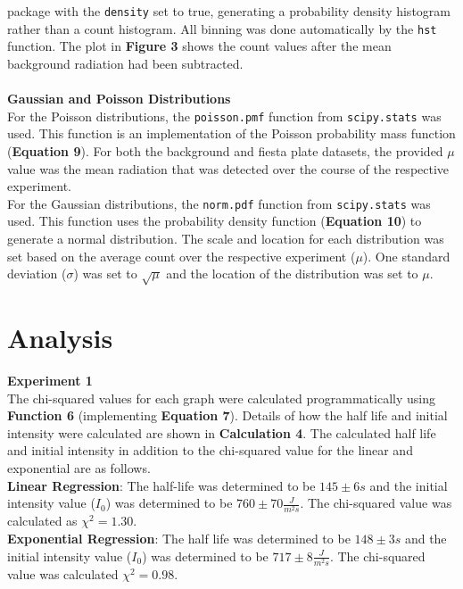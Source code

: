 \documentclass[
	letterpaper, %
	10pt, %
]{CSUniSchoolLabReport}
\begin{document}
package with the \lstinline{density} set to true, generating a probability density histogram rather than a count
histogram. All binning was done automatically by the \lstinline{hst} function. The plot in \textbf{Figure 3} shows the count
values after the mean background radiation had been subtracted.\\\\
{\large\textbf{Gaussian and Poisson Distributions}}\\
For the Poisson distributions, the \lstinline{poisson.pmf} function from \lstinline{scipy.stats} was used. This function is an implementation of the Poisson probability mass function (\textbf{Equation 9}). For both the background and fiesta plate datasets, the provided $\mu$ value was the mean radiation that was detected over the course of the respective experiment.\\

For the Gaussian distributions, the \lstinline{norm.pdf} function from \lstinline{scipy.stats} was used. This function uses the probability density function (\textbf{Equation 10}) to generate a normal distribution. The scale and location for each distribution was set based on the average count over the respective experiment ($\mu$). One standard deviation ($\sigma$) was set to $\sqrt\mu$ and the location of the distribution was set to $\mu$.
\newpage
\section{Analysis}
\vspace{20pt}
{\Large\textbf{Experiment 1}}\\

The chi-squared values for each graph were calculated programmatically using \textbf{Function 6} (implementing
\textbf{Equation 7}). Details of how the half life and initial intensity were calculated are shown in \textbf{Calculation 4}.
The calculated half life and initial intensity in addition to the chi-squared value for the linear and exponential are as follows.\\

\textbf{Linear Regression}: The half-life was determined to be $145 \pm 6s$ and the initial intensity value ($I_0$) was
determined to be $760\pm70\frac{J}{m^2 s}$. The chi-squared value was calculated as $\chi^2 = 1.30$.\\

\textbf{Exponential Regression}: The half life was determined to be $148 \pm 3s$ and the initial intensity value ($I_0$) was
determined to be $717\pm8\frac{J}{m^2s}$. The chi-squared value was calculated $\chi^2 = 0.98$.\\
\end{document}
